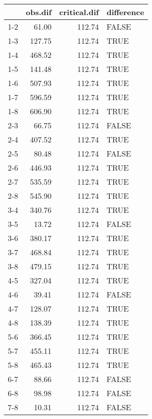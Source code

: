\begin{table}[ht]
\centering
\begin{tabular}{rrrl}
  \hline
 & obs.dif & critical.dif & difference \\ 
  \hline
1-2 & 61.00 & 112.74 & FALSE \\ 
  1-3 & 127.75 & 112.74 & TRUE \\ 
  1-4 & 468.52 & 112.74 & TRUE \\ 
  1-5 & 141.48 & 112.74 & TRUE \\ 
  1-6 & 507.93 & 112.74 & TRUE \\ 
  1-7 & 596.59 & 112.74 & TRUE \\ 
  1-8 & 606.90 & 112.74 & TRUE \\ 
  2-3 & 66.75 & 112.74 & FALSE \\ 
  2-4 & 407.52 & 112.74 & TRUE \\ 
  2-5 & 80.48 & 112.74 & FALSE \\ 
  2-6 & 446.93 & 112.74 & TRUE \\ 
  2-7 & 535.59 & 112.74 & TRUE \\ 
  2-8 & 545.90 & 112.74 & TRUE \\ 
  3-4 & 340.76 & 112.74 & TRUE \\ 
  3-5 & 13.72 & 112.74 & FALSE \\ 
  3-6 & 380.17 & 112.74 & TRUE \\ 
  3-7 & 468.84 & 112.74 & TRUE \\ 
  3-8 & 479.15 & 112.74 & TRUE \\ 
  4-5 & 327.04 & 112.74 & TRUE \\ 
  4-6 & 39.41 & 112.74 & FALSE \\ 
  4-7 & 128.07 & 112.74 & TRUE \\ 
  4-8 & 138.39 & 112.74 & TRUE \\ 
  5-6 & 366.45 & 112.74 & TRUE \\ 
  5-7 & 455.11 & 112.74 & TRUE \\ 
  5-8 & 465.43 & 112.74 & TRUE \\ 
  6-7 & 88.66 & 112.74 & FALSE \\ 
  6-8 & 98.98 & 112.74 & FALSE \\ 
  7-8 & 10.31 & 112.74 & FALSE \\ 
   \hline
\end{tabular}
\end{table}
